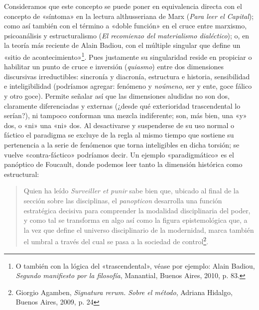 Consideramos que este concepto se puede poner en equivalencia directa con el concepto de «síntoma» en la lectura althusseriana de Marx (\emph{Para leer el Capital}); como así también con el término a «doble función» en el cruce entre marxismo, psicoanálisis y estructuralismo (\emph{El recomienzo del materialismo dialéctico}); o, en la teoría más reciente de Alain Badiou, con el múltiple singular que define un «sitio de acontecimiento»\footnote{O también con la lógica del «trascendental», véase por ejemplo: Alain Badiou, \emph{Segundo manifiesto por la filosofía}, Manantial, Buenos Aires, 2010, p. 83.}. Pues justamente su singularidad reside en propiciar o habilitar un punto de cruce e inversión (\emph{quiasmo}) entre dos dimensiones discursivas irreductibles: sincronía y diacronía, estructura e historia, sensibilidad e inteligibilidad (podríamos agregar: fenómeno y \emph{noúmeno}, ser y ente, goce fálico y otro goce). Permite señalar así que las dimensiones aludidas no son dos, claramente diferenciadas y externas (¿desde qué exterioridad trascendental lo serían?), ni tampoco conforman una mezcla indiferente; son, más bien, una «y» dos, o «ni» una «ni» dos. Al desactivarse y suspenderse de su uso normal o fáctico el paradigma se excluye de la regla al mismo tiempo que sostiene su pertenencia a la serie de fenómenos que torna inteligibles en dicha torsión; se vuelve «contra-fáctico» podríamos decir. Un ejemplo «paradigmático» es el panóptico de Foucault, donde podemos leer tanto la dimensión histórica como estructural:

\begin{quote}
Quien ha leído \emph{Surveiller et punir} sabe bien que, ubicado al final de la sección sobre las disciplinas, el \emph{panopticon} desarrolla una función estratégica decisiva para comprender la modalidad disciplinaria del poder, y como tal se transforma en algo así como la figura epistemológica que, a la vez que define el universo disciplinario de la modernidad, marca también el umbral a través del cual se pasa a la sociedad de control\footnote{Giorgio Agamben, \emph{Signatura rerum. Sobre el método}, Adriana Hidalgo, Buenos Aires, 2009, p. 24}.
\end{quote}

